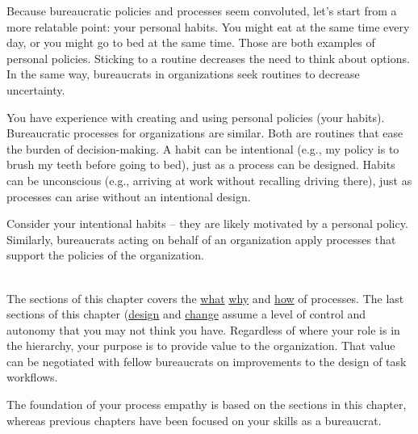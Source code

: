
Because bureaucratic policies and processes seem convoluted, let's start from a more relatable point: your personal habits.
You might eat at the same time every day, or you might go to bed at the same time. Those are both examples of personal policies. Sticking to a routine decreases the need to think about options. In the same way, bureaucrats in organizations seek routines to decrease uncertainty. 

You have experience with creating and using personal policies (your habits).  Bureaucratic processes for organizations are similar.
Both are routines that ease the burden of decision-making. A habit can be intentional (e.g., my policy is to brush my teeth before going to bed), just as a process can be designed. Habits can be unconscious (e.g., arriving at work without recalling driving there), just as processes can arise without an intentional design. 

Consider your intentional habits -- they are likely motivated by a personal policy. Similarly, bureaucrats acting on behalf of an organization apply processes that support the policies of the organization.

\ \\

The sections of this chapter covers 
the \hyperref[sec:definition-of-process]{what}%
\iftoggle{haspagenumbers}{ (page~\pageref{sec:definition-of-process}), }{,}%
\hyperref[sec:why-processes-exist]{why}%
\iftoggle{haspagenumbers}{ (page~\pageref{sec:why-processes-exist}), }{,}%
and 
\hyperref[sec:process-chaos]{how}%
\iftoggle{haspagenumbers}{ (page~\pageref{sec:process-chaos}) }{}%
of processes. 
The last sections of this chapter 
(\hyperref[sec:design-of-processes]{design}%
\iftoggle{haspagenumbers}{ on page~\pageref{sec:design-of-processes} }{}%
and 
\hyperref[sec:change-a-process]{change}%
\iftoggle{haspagenumbers}{ on page~\pageref{sec:change-a-process})}{)}
assume a level of control and autonomy that you may not think  you have. Regardless of where your role is in the hierarchy, your purpose is to provide value to the organization. That value can be negotiated with fellow bureaucrats on improvements to the design of task workflows. 

The foundation of your \gls{process empathy} is based on the sections in this chapter, whereas previous chapters have been focused on your skills as a bureaucrat. 